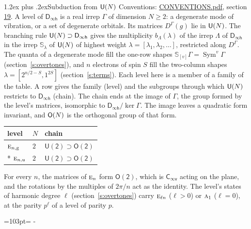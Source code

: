\documentclass[10pt,a4paper]{article}
\makeatletter
\renewcommand\section{\@startsection{section}{1}{\z@}{-3ex plus -1ex minus -.2ex}%
  {1.2ex plus .2ex}{\normalfont\large\sffamily\bfseries\color{parttitle}}}
\newcommand{\needspace}[1]{\par\penalty-100\begingroup\dimen0=#1\relax\dimen2=\pagegoal
  \advance\dimen2-\pagetotal\ifdim\dimen0>\dimen2\relax\ifdim\dimen2>0pt\vfil\break\fi\fi
  \endgroup}
\numberwithin{equation}{section}
\newcommand{\grp}[1]{\mathsf{#1}}
\newcommand{\irr}[1]{\text{\normalfont\scshape #1}}
\newcommand{\ptag}[1]{\mathrm{#1}}
\newcommand{\repD}[1]{D^{#1}}
\newcommand{\schur}[1]{\mathbb{S}_{#1}}
\newcommand{\shape}[1]{[#1]}
\makeatother
\begin{document}
\section{Subduction from \texorpdfstring{$\grp{U(\mathnormal{N})}$}{U(N)}}\label{s:unitary}
Conventions: \href{../../CONVENTIONS.pdf}{CONVENTIONS.pdf}, section \href{../../CONVENTIONS.pdf\#conv.19}{19}.
\leavevmode\label{n:local.level.dimension}A level of $\grp{D_{\infty h}}$ is a real irrep $\Gamma$ of dimension $N \ge 2$: a degenerate mode of vibration, or a set of degenerate orbitals. \label{n:group.unitary}Its matrices $\repD{\Gamma}(g)$ lie in $\grp{U(\mathnormal{N})}$. \label{n:irrep.schur}\label{n:shape.partition}\label{n:local.partition}\label{n:function.multiplicity.unitary}The branching rule $\grp{U(\mathnormal{N})} \supset \grp{D_{\infty h}}$ gives the multiplicity $b_\Lambda(\lambda)$ of the irrep $\Lambda$ of $\grp{D_{\infty h}}$ in the irrep $\schur{\lambda}$ of $\grp{U(\mathnormal{N})}$ of highest weight $\lambda = \shape{\lambda_1, \lambda_2, \dots}$, restricted along $\repD{\Gamma}$. \label{n:local.partition.power}\label{n:local.electrons}\label{n:local.spin}The quanta of a degenerate mode fill the one-row shapes $\schur{\shape{v}}\Gamma = \operatorname{Sym}^{v}\Gamma$ (section~\ref{s:overtones}), and $n$ electrons of spin $S$ fill the two-column shapes $\lambda = \shape{2^{n/2-S}, 1^{2S}}$ (section~\ref{s:terms}).
Each level here is a member of a family of the table. \label{n:head.level}\label{n:head.chain}A row gives the family (level) and the subgroups through which $\grp{U(\mathnormal{N})}$ restricts to $\grp{D_{\infty h}}$ (chain). The chain ends at the image of $\Gamma$, the group formed by the level's matrices, isomorphic to $\grp{D_{\infty h}}/\ker\Gamma$. The image leaves a quadratic form invariant, and $\grp{O(\mathnormal{N})}$ is the orthogonal group of that form.
{\small\begin{longtable}{@{}lll@{}}\toprule
level & $N$ & chain\\\midrule\endhead
\bottomrule\endfoot\endlastfoot
$\irr{e}_{n,\ptag{g}}$ & $2$ & $\grp{U(2)} \supset \grp{O(2)}$\\*
$\irr{e}_{n,\ptag{u}}$ & $2$ & $\grp{U(2)} \supset \grp{O(2)}$\\
\bottomrule\end{longtable}}
For every $n$, the matrices of $\irr{e}_n$ form $\grp{O(2)}$, which is \href{Cinfv.pdf}{$\grp{C_{\infty v}}$} acting on the plane, and the rotations by the multiples of $2\pi/n$ act as the identity. \label{n:index.harmonic.degree}The level's states of harmonic degree $\ell$ (section~\ref{s:overtones}) carry $\irr{e}_{\ell n}$ ($\ell > 0$) or $\irr{a}_{1}$ ($\ell = 0$), at the parity $p^{\ell}$ of a level of parity $p$.
\needspace{103pt}
\end{document}
